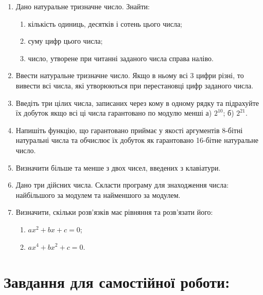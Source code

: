 \documentclass[a5paper,titlepage,openany,twoside,draft]{book_unv}%
\makeatletter
\newcommand{\xslalph}[1]{\expandafter\@xslalph\csname c@#1\endcsname}
\newcommand{\@xslalph}[1]{%
    \ifcase#1\or а\or б\or в\or г\or д\or e\or є\or ж\or з\or i%
    \or й\or к\or л\or м\or н\or о\or п\or р\or с\or т%
    \or у\or ф\or х\or ц\or ч\or ш\or ю\or я\or аа\or бб\or вв%
    \else\@ctrerr\fi%
}
\makeatother
\begin{document}
\begin{enumerate}
\def\labelenumi{\arabic{enumi})}
\item
Дано натуральне тризначне число. Знайти:
  \begin{enumerate}[label=\xslalph*)]
\item кількість одиниць, десятків і сотень цього числа;
\item суму цифр цього числа;
\item число, утворене при читанні заданого числа справа наліво.
\end{enumerate}

\item
Ввести натуральне тризначне число. Якщо в ньому всі 3 цифри різні, то
вивести всі числа, які утворюються при перестановці цифр заданого числа.
\item
Введіть три цілих числа, записаних через кому в одному рядку та
підрахуйте їх добуток якщо всі ці числа гарантовано по модулю менші а)
\(2^{10}\); б) \(2^{21}\).

\item
Напишіть функцію, що гарантовано приймає у якості аргументів 8-бітні
натуральні числа та обчислює їх добуток як гарантовано 16-бітне
натуральне число.
\item
Визначити більше та менше з двох чисел, введених з клавіатури.
\item
Дано три дійсних числа. Скласти програму для знаходження числа:
найбільшого за модулем та найменшого за модулем.
\item
Визначити, скільки розв'язків має рівняння та розв'язати його:
  \begin{enumerate}[label=\xslalph*)]
\item \(ax^{2} + bx + c = 0\);
\item \(ax^{4} + bx^{2} + c = 0\).
  \end{enumerate}
\end{enumerate}

\section{Завдання для самостійної роботи:}
\end{document}
